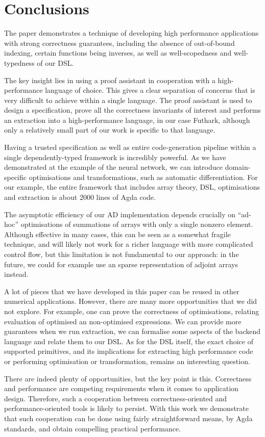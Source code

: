 \section{Conclusions\label{sec:conclusions}}

The paper demonstrates a technique of developing high performance
applications with strong correctness guarantees, including the absence
of out-of-bound indexing, certain functions being inverses, as well as
well-scopedness and well-typedness of our DSL.

The key insight lies in using a proof assistant in cooperation with a
high-performance language of choice. This gives a clear separation of
concerns that is very difficult to achieve within a single language.
The proof assistant is used to design a specification, prove all the
correctness invariants of interest and performs an extraction into a
high-performance language, in our case Futhark, although only a
relatively small part of our work is specific to that language.

Having a trusted specification as well as entire code-generation
pipeline within a single dependently-typed framework is incredibly
powerful. As we have demonstrated at the example of the neural
network, we can introduce domain-specific optimisations and
transformations, such as automatic differentiation. For our example,
the entire framework that includes array theory, DSL, optimisations
and extraction is about 2000 lines of Agda code.

The asymptotic efficiency of our AD implementation depends crucially
on ``ad-hoc'' optimisations of summations of arrays with only a single
nonzero element. Although effective in many cases, this can be seen as
a somewhat fragile technique, and will likely not work for a richer
language with more complicated control flow, but this limitation is
not fundamental to our approach: in the future, we could for example
use an sparse representation of adjoint arrays instead.

A lot of pieces that we have developed in this paper can be reused in
other numerical applications. However, there are many more
opportunities that we did not explore. For example, one can prove the
correctness of optimisations, relating evaluation of optimised an
non-optimised expressions. We can provide more guarantees when we run
extraction, \eg{} we can formalise some aspects of the backend
language and relate them to our DSL. As for the DSL itself, the exact
choice of supported primitives, and its implications for extracting
high performance code or performing optimisation or transformation,
remains an interesting question.

There are indeed plenty of opportunities, but the key point is this.
Correctness and performance are competing requirements when it comes
to application design. Therefore, such a cooperation between
correctness-oriented and performance-oriented tools is likely to
persist. With this work we demonstrate that such cooperation can be
done using fairly straightforward means, by Agda standards, and obtain
compelling practical performance.
